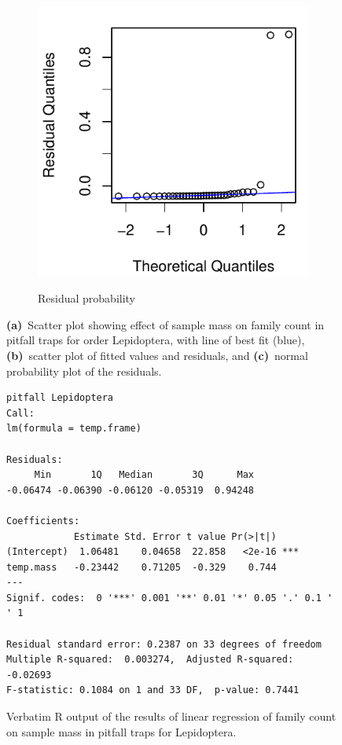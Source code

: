 \documentclass[10pt,letterpaper,twocolumn]{article}
\begin{document}
\begin{figure}[h]
\begin{subfigure}[b]{0.15\textwidth}
		\label{fig:pitfall_lepidoptera_resid}
	\end{subfigure}
	~
	\begin{subfigure}[b]{0.15\textwidth}
		\caption{Residual probability}
		\includegraphics[width=\textwidth]{plots/mass-vs-count/qqplot/2015_pitfall_Lepidoptera_qqplot.pdf}
		\label{fig:pitfall_lepidoptera_qqplot}
	\end{subfigure}
	\caption{\textbf{(a)}~Scatter plot showing effect of sample mass on family count in pitfall traps for order Lepidoptera, with line of best fit (blue), \textbf{(b)}~scatter plot of fitted values and residuals, and \textbf{(c)}~normal probability plot of the residuals.}
	\label{fig:pitfall_lepidoptera}
	\smallskip
	\nointerlineskip
	\hrulefill
\end{figure}

\begin{figure}[h]
	\lstset{numbers=left}
	\lstset{xleftmargin=5mm,framexleftmargin=5mm}
	\begin{lstlisting}
pitfall Lepidoptera
Call:
lm(formula = temp.frame)

Residuals:
     Min       1Q   Median       3Q      Max 
-0.06474 -0.06390 -0.06120 -0.05319  0.94248 

Coefficients:
            Estimate Std. Error t value Pr(>|t|)    
(Intercept)  1.06481    0.04658  22.858   <2e-16 ***
temp.mass   -0.23442    0.71205  -0.329    0.744    
---
Signif. codes:  0 '***' 0.001 '**' 0.01 '*' 0.05 '.' 0.1 ' ' 1

Residual standard error: 0.2387 on 33 degrees of freedom
Multiple R-squared:  0.003274,	Adjusted R-squared:  -0.02693 
F-statistic: 0.1084 on 1 and 33 DF,  p-value: 0.7441
	\end{lstlisting}
	\caption{Verbatim R output of the results of linear regression of family count on sample mass in pitfall traps for Lepidoptera.}
	\label{fig:pitfall_lepidoptera_regression}
	\smallskip
	\nointerlineskip
	\hrulefill
\end{figure}
\end{document}
